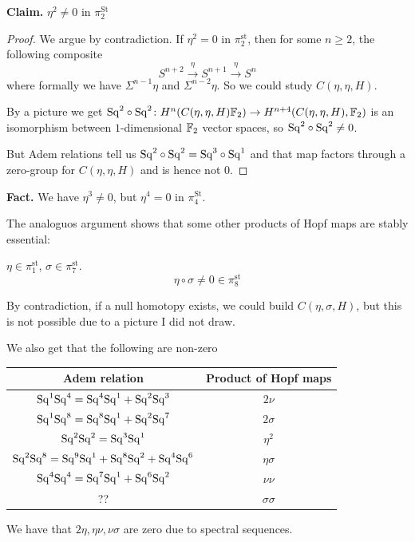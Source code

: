 \documentclass[language=english]{TemplateLecture}
\begin{document}
\textbf{Claim.} \(\eta^2 \neq 0\) in \(\pi_2^{\mathrm{St}}\)

\begin{proof}
    We argue by contradiction. If \(\eta^2 = 0\) in \(\pi_2^{\mathrm{st}}\), then for some \(n \geq 2\), the following composite
    \[S^{n+2}\xrightarrow{\eta} S^{n+1}\xrightarrow{\eta} S^n\]
    where formally we have \(\Sigma^{n-1}\eta\) and \(\Sigma^{n-2}\eta\). So we could study \(C(\eta, \eta, H)\).

    By a picture we get \(\mathrm{Sq}^2\circ \mathrm{Sq}^2 \colon H^n (C(\eta, \eta, H) \mathbb{F}_2) \to H^{n+4}(C(\eta, \eta, H), \mathbb{F}_2)\) is an isomorphism between \(1\)-dimensional \(\mathbb{F}_2\) vector spaces, so \(\mathrm{Sq}^2 \circ \mathrm{Sq}^2 \neq 0\).

    But Adem relations tell us \(\mathrm{Sq}^2 \circ \mathrm{Sq}^2 = \mathrm{Sq}^3 \circ \mathrm{Sq}^1\) and that map factors through a zero-group for \(C(\eta, \eta, H)\) and is hence not 0.
\end{proof}

\textbf{Fact.} We have \(\eta^3 \neq 0\), but \(\eta^4 = 0\) in \(\pi_4^{\mathrm{St}}\).

The analoguos argument shows that some other products of Hopf maps are stably essential:

\begin{example}
    \(\eta \in \pi_1^{\mathrm{st}}\), \(\sigma\in \pi_7^{\mathrm{st}}\).
    \[\eta \circ \sigma \neq 0 \in \pi_8^{\mathrm{st}}\]

    By contradiction, if a null homotopy exists, we could build \(C(\eta, \sigma, H)\), but this is not possible due to a picture I did not draw.
\end{example}

We also get that the following are non-zero

\begin{center}
    \begin{tabular}{c|c}
        Adem relation & Product of Hopf maps \\\hline 
        \(\mathrm{Sq}^1\mathrm{Sq}^4 = \mathrm{Sq}^4\mathrm{Sq}^1 + \mathrm{Sq}^2\mathrm{Sq}^3\) & \(2\nu\) \\
        \(\mathrm{Sq}^1 \mathrm{Sq}^8 = \mathrm{Sq}^8\mathrm{Sq}^1+ \mathrm{Sq}^2\mathrm{Sq}^7\) & \(2\sigma\) \\
        \(\mathrm{Sq}^2\mathrm{Sq}^2 = \mathrm{Sq}^3\mathrm{Sq}^1\) & \(\eta^2\) \\
        \(\mathrm{Sq}^2\mathrm{Sq}^8 = \mathrm{Sq}^9\mathrm{Sq}^1 + \mathrm{Sq}^8\mathrm{Sq}^2+\mathrm{Sq}^4\mathrm{Sq}^6\) & \(\eta\sigma\) \\
        \(\mathrm{Sq}^4\mathrm{Sq}^4 = \mathrm{Sq}^7\mathrm{Sq}^1 + \mathrm{Sq}^6\mathrm{Sq}^2\) & \(\nu\nu\) \\
        ?? & \(\sigma\sigma\) \\
    \end{tabular}
\end{center}
We have that \(2\eta, \eta\nu, \nu\sigma\) are zero due to spectral sequences.
\end{document}

